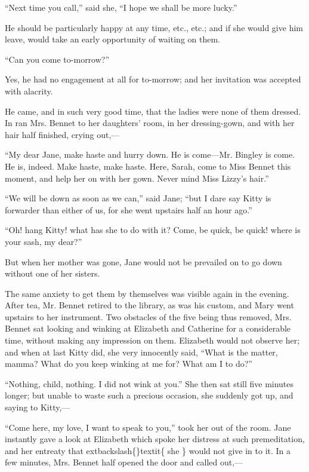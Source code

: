\documentclass[10pt]{book}
\begin{document}
   “Next time you call,” said she, “I hope we shall be more lucky.”
  

   He should be particularly happy at any time, etc., etc.; and if she
would give him leave, would take an early opportunity of waiting on
them.
  

   “Can you come to-morrow?”
  

   Yes, he had no engagement at all for to-morrow; and her invitation was
accepted with alacrity.
  

   He came, and in such very good time, that the ladies were none of them
dressed. In ran Mrs. Bennet to her daughters’ room, in her
dressing-gown, and with her hair half finished, crying out,—
  

   “My dear Jane, make haste and hurry down. He is come—Mr. Bingley is
come. He is, indeed. Make haste, make haste. Here, Sarah, come to Miss
Bennet this moment, and help her on with her gown. Never mind Miss
Lizzy’s hair.”
  

   “We will be down as soon as we can,” said Jane; “but I dare say Kitty is
forwarder than either of us, for she went upstairs half an hour ago.”
  

   “Oh! hang Kitty! what has she to do with it? Come, be quick, be quick!
where is your sash, my dear?”
  

   But when her mother was gone, Jane would not be prevailed on to go down
without one of her sisters.
  

   The same anxiety to get them by themselves was visible again in the
evening. After tea, Mr. Bennet retired to the library, as was his
custom, and Mary went upstairs to her instrument. Two obstacles of the
five being thus removed, Mrs. Bennet sat looking and winking at
Elizabeth and Catherine for a considerable time, without
   making any
impression on them. Elizabeth would not observe her; and when at last
Kitty did, she very innocently said, “What is the matter, mamma? What do
you keep winking at me for? What am I to do?”
  

   “Nothing, child, nothing. I did not wink at you.” She then sat still
five minutes longer; but unable to waste such a precious occasion, she
suddenly got up, and saying to Kitty,—
  

   “Come here, my love, I want to speak to you,” took her out of the room.
Jane instantly gave a look at Elizabeth which spoke her distress at such
premeditation, and her entreaty that
   	extbackslash\{\}textit\{
    she
   \}
   would not give in to it. In a
few minutes, Mrs. Bennet half opened the door and called out,—
  
\end{document}
